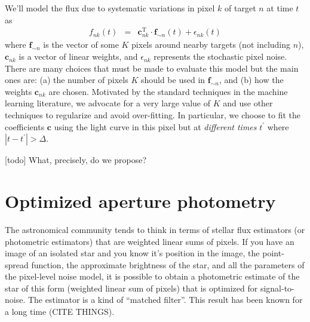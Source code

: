 \documentclass[letterpaper,12pt,preprint]{hack_aastex}
\newcommand{\bvec}[1]{{\ensuremath{{\boldsymbol{#1}}}}}
\begin{document}
We'll model the flux due to systematic variations in pixel $k$ of target
$n$ at time $t$ as
\begin{eqnarray}
f_{nk}(t) &=& \bvec{c}_{nk}^\mathrm{T}\cdot\bvec{f}_{\sim n}(t)
              + \epsilon_{nk}(t)
\end{eqnarray}
where $\bvec{f}_{\sim n}$ is the vector of some $K$ pixels around nearby
targets (not including $n$), $\bvec{c}_{nk}$ is a vector of linear weights,
and $\epsilon_{nk}$ represents the stochastic pixel noise.
There are many choices that must be made to evaluate this model but the main
ones are: (a) the number of pixels $K$ should be used in $\bvec{f}_{\sim n}$,
and (b) how the weights $\bvec{c}_{nk}$ are chosen.
Motivated by the standard techniques in the machine learning literature, we
advocate for a very large value of $K$ and use other techniques to regularize
and avoid over-fitting.
In particular, we choose to fit the coefficients $\bvec{c}$ using the light
curve in this pixel but at \emph{different times} $t^\prime$ where
$|t-t^\prime| > \Delta$.


[todo] What, precisely, do we propose?

\section{Optimized aperture photometry}

The astronomical community tends to think in terms of stellar flux estimators
(or photometric estimators) that are weighted linear sums of pixels.
If you have an image of an isolated star and you know it's position in the
image, the point-spread function, the approximate brightness of the star, and
all the parameters of the pixel-level noise model, it is possible to obtain a
photometric estimate of the star of this form (weighted linear sum of pixels)
that is optimized for signal-to-noise.
The estimator is a kind of ``matched filter''.
This result has been known for a long time (CITE THINGS).
\end{document}
